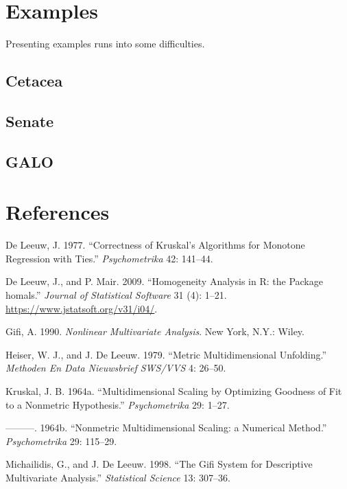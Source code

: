 \documentclass[
  12pt,
]{article}
\newlength{\cslhangindent}
\newenvironment{CSLReferences}[2] %
 {\begin{list}{}{%
  \setlength{\itemindent}{0pt}
  \setlength{\leftmargin}{0pt}
  \setlength{\parsep}{0pt}
  \ifodd #1
   \setlength{\leftmargin}{\cslhangindent}
   \setlength{\itemindent}{-1\cslhangindent}
  \fi
  \setlength{\itemsep}{#2\baselineskip}}}
 {\end{list}}
\begin{document}
\section{Examples}\label{examples}

Presenting examples runs into some difficulties.

\subsection{Cetacea}\label{cetacea}

\subsection{Senate}\label{senate}

\subsection{GALO}\label{galo}

\section*{References}\label{references}

\label{refs}
\begin{CSLReferences}{1}{0}
De Leeuw, J. 1977. {``Correctness of Kruskal's Algorithms for Monotone Regression with Ties.''} \emph{Psychometrika} 42: 141--44.

De Leeuw, J., and P. Mair. 2009. {``{Homogeneity Analysis in {R}: the Package homals}.''} \emph{Journal of Statistical Software} 31 (4): 1--21. \url{https://www.jstatsoft.org/v31/i04/}.

Gifi, A. 1990. \emph{Nonlinear Multivariate Analysis}. New York, N.Y.: Wiley.

Heiser, W. J., and J. De Leeuw. 1979. {``Metric Multidimensional Unfolding.''} \emph{Methoden En Data Nieuwsbrief SWS/VVS} 4: 26--50.

Kruskal, J. B. 1964a. {``{Multidimensional Scaling by Optimizing Goodness of Fit to a Nonmetric Hypothesis}.''} \emph{Psychometrika} 29: 1--27.

---------. 1964b. {``{Nonmetric Multidimensional Scaling: a Numerical Method}.''} \emph{Psychometrika} 29: 115--29.

Michailidis, G., and J. De Leeuw. 1998. {``The Gifi System for Descriptive Multivariate Analysis.''} \emph{Statistical Science} 13: 307--36.

\end{CSLReferences}
\end{document}
